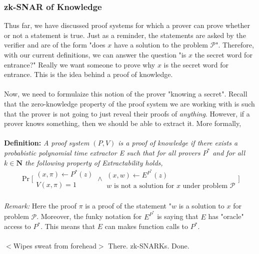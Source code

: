 \documentclass{article}
\newcommand{\N}{{\mathbf N}}
\begin{document}
\subsubsection{zk-SNAR of Knowledge}
Thus far, we have discussed proof systems for which a prover can prove whether or not a statement is true. Just as a reminder, the statements are asked by the verifier and are of the form "does $x$ have a solution to the problem $\mathcal{P}$". Therefore, with our current definitions, we can answer the question "is $x$ the secret word for entrance?" Really we want someone to prove why $x$ is the secret word for entrance. This is the idea behind a proof of knowledge. \\ \\
\noindent Now, we need to formulaize this notion of the prover "knowing a secret". Recall that the zero-knowledge property of the proof system we are working with is such that the prover is not going to just reveal their proofs of \textit{anything}. However, if a prover knows something, then we should be able to extract it. More formally, \\ \\
\noindent \textbf{Definition: } \textit{A proof system $(P, V)$ is a proof of knowledge if there exists a probabistic polynomial time extractor E such that for all provers $P^*$ and for all $k \in \N$ the following property of Extractability holds,}
$$\Pr\bigg[\begin{array}{c} (x, \pi) \leftarrow P^*(z) \\ V(x, \pi) = 1\end{array} \wedge \begin{array}{c} (x, w) \leftarrow E^{P^*}(z) \\ w \text{ is not a solution for } x \text{ under problem } \mathcal{P}\end{array}\bigg]$$
\\
\noindent \textit{Remark: } Here the proof $\pi$ is a proof of the statement "$w$ is a solution to $x$ for problem $\mathcal{P}$. Moreover, the funky notation for $E^{P^*}$ is saying that $E$ has "oracle" access to $P^*$. This means that $E$ can makes function calls to $P^*$.\\ \\
\noindent $<$Wipes sweat from forehead$>$ There. zk-SNARKs. Done.
\end{document}
